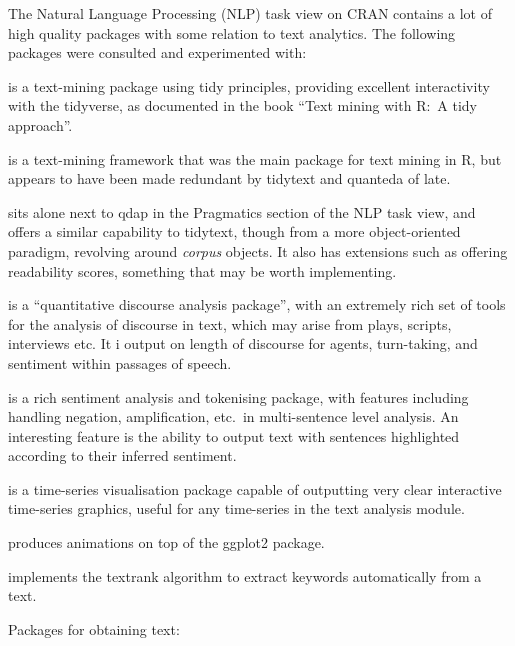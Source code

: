 \message{ !name(jason-cairns-dissertation.tex)}\documentclass[11pt, a4paper, titlepage]{report}
\begin{document}
The Natural Language Processing (NLP) task view on CRAN contains a lot
of high quality packages with some relation to text
analytics\autocite{wild:_cran_task_view}. The following packages were
consulted and experimented with:

\begin{description}
\item[tidytext\autocite{Silge2016tidytext}] is a text-mining package
  using tidy principles, providing excellent interactivity with the
  tidyverse, as documented in the book ``Text mining with R:~A tidy
  approach''\autocite{silge2017text}.
\item[tm\autocite{feinerer18}] is a text-mining framework that was the
  main package for text mining in R, but appears to have been made
  redundant by tidytext and quanteda of late.
\item[quanteda\autocite{benoit18}] sits alone next to qdap in the
  Pragmatics section of the NLP task view, and offers a similar
  capability to tidytext, though from a more object-oriented paradigm,
  revolving around \textit{corpus} objects. It also has extensions
  such as offering readability scores, something that may be worth
  implementing.
\item[qdap\autocite{rinker19qdap}] is a ``quantitative discourse
  analysis package'', with an extremely rich set of tools for the
  analysis of discourse in text, which may arise from plays, scripts,
  interviews etc. It i output on length of discourse for agents,
  turn-taking, and sentiment within passages of speech.
\item[sentimentr\autocite{rinker19sent}] is a rich sentiment analysis
  and tokenising package, with features including handling negation,
  amplification, etc.\ in multi-sentence level analysis. An
  interesting feature is the ability to output text with sentences
  highlighted according to their inferred sentiment.
\item[dygraphs\autocite{vanderkam18}] is a time-series visualisation
  package capable of outputting very clear interactive time-series
  graphics, useful for any time-series in the text analysis module.
\item[gganimate\autocite{pedersen19}] produces animations on top of
  the ggplot2 package.
\item[textrank\autocite{wijffels19}] implements the textrank algorithm
  to extract keywords automatically from a text.
\item Packages for obtaining text:
  \begin{description}

\end{description}
\end{description}
\end{document}
